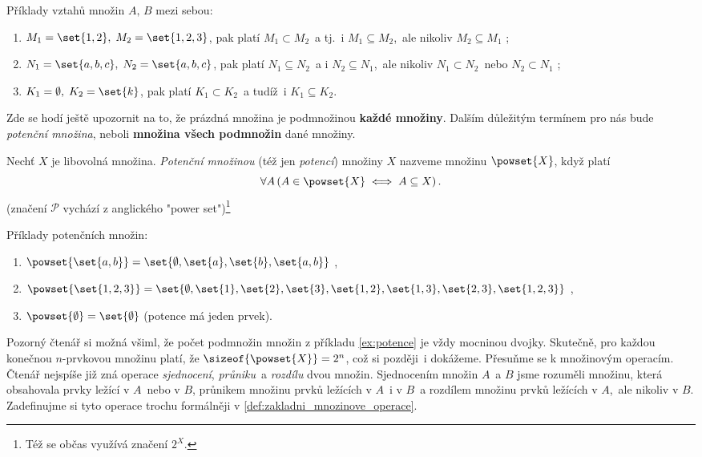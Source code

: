 \begin{example}
    Příklady vztahů množin $A,\,B$ mezi sebou:
    \begin{enumerate}[label=(\roman*)]
        \item $M_1=\set{1,2},\; M_2=\set{1,2,3}$, pak platí $M_1 \subset M_2$~a tj.~i $M_1 \subseteq M_2$,~ale nikoliv $M_2 \subseteq M_1$ ;
        \item $N_1=\set{a,b,c},\; N_2=\set{a,b,c}$, pak platí $N_1 \subseteq N_2$~a i $N_2 \subseteq N_1$,~ale nikoliv $N_1 \subset N_2$~nebo $N_2 \subset N_1$ ;
        \item $K_1=\emptyset,\; K_2=\set{k}$, pak platí $K_1 \subset K_2$~a tudíž~i $K_1 \subseteq K_2$.
    \end{enumerate}
\end{example}
Zde se hodí ještě upozornit na to, že prázdná množina je podmnožinou \textbf{každé množiny}. Dalším důležitým termínem pro nás bude \emph{potenční množina}, neboli \textbf{množina všech podmnožin} dané množiny.
\begin{definition}\label{def:potence}
    Nechť $X$ je libovolná množina. \emph{Potenční množinou} (též jen \emph{potencí}) množiny $X$ nazveme množinu $\powset{X}$, když platí
    \begin{equation*}
        \forall A \left(A \in \powset{X} \iff A \subseteq X\right).
    \end{equation*}
    (značení $\mathcal{P}$ vychází z anglického "power set")\footnote{Též se občas využívá značení $2^{X}$.}
\end{definition} 
\begin{example}\label{ex:potence}
    Příklady potenčních množin:
    \begin{enumerate}[label=(\roman*)]
        \item $\powset{\set{a,b}}=\set{\emptyset,\set{a},\set{b},\set{a,b}}$ ,
        \item $\powset{\set{1,2,3}}=\set{\emptyset,\set{1},\set{2},\set{3},\set{1,2},\set{1,3},\set{2,3},\set{1,2,3}}$ ,
        \item $\powset{\emptyset}=\set{\emptyset}$ (potence má jeden prvek).
    \end{enumerate}
\end{example}
Pozorný čtenář si možná všiml, že počet podmnožin množin z příkladu \ref{ex:potence} je vždy mocninou dvojky. Skutečně, pro každou konečnou $n$-prvkovou množinu platí, že $\sizeof{\powset{X}}=2^n$, což si později~i dokážeme.
Přesuňme se k množinovým operacím. Čtenář nejspíše již zná operace \emph{sjednocení}, \emph{průniku}~a \emph{rozdílu} dvou množin. Sjednocením množin $A$~a $B$ jsme rozuměli množinu, která obsahovala prvky ležící v $A$~nebo v $B$, průnikem množinu prvků ležících v $A$~i v $B$~a rozdílem množinu prvků ležících v $A$,~ale nikoliv v $B$. Zadefinujme si tyto operace trochu formálněji v \ref{def:zakladni_mnozinove_operace}. 
